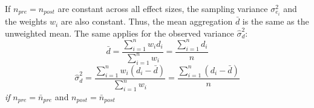 \newpage
\par If $n_{pre} = n_{post}$ are constant across all effect sizes, the sampling variance $\sigma^2_{e_{i}}$ and the weights $w_{i}$ are also constant. Thus, the mean aggregation $\bar{d}$ is the same as the unweighted mean. The same applies for the observed variance $\hat{\sigma}^2_{d}$:
\begin{equation} \label{eq:mean_unweighted}
    \bar{d} = \frac{\sum_{i=1}^{n} w_{i} d_{i}}{\sum_{i=1}^{n} w_{i}} = \frac{\sum_{i=1}^{n} d_{i}}{n}
\end{equation}
\begin{equation} \label{eq:variance_observed_unweighted}
    \hat{\sigma}^2_{d} = \frac{\sum_{i=1}^{n} w_{i} (d_{i}-\bar{d})}{\sum_{i=1}^{n} w_{i}} = \frac{\sum_{i=1}^{n} (d_{i}-\bar{d})}{n}
\end{equation}
\hspace{0.5cm} \textit{if} $n_{pre} = \bar{n}_{pre}$ and $n_{post} = \bar{n}_{post}$